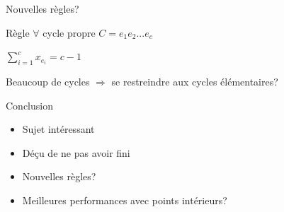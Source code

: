 \documentclass{beamer}
\begin{document}
\begin{frame}{Nouvelles règles?}
\begin{block}{Règle}
$\forall$ cycle propre $C = e_{1} e_{2} ... e_{c}$

$\sum_{i=1}^{c}x_{e_{i}} = c-1$
\end{block}

Beaucoup de cycles $\Rightarrow$ se restreindre aux cycles élémentaires?

\end{frame}

\begin{frame}{Conclusion}
\begin{itemize}
\item Sujet intéressant
\item Déçu de ne pas avoir fini
\item Nouvelles règles?
\item Meilleures performances avec points intérieurs?
\end{itemize}
\end{frame}
\end{document}
